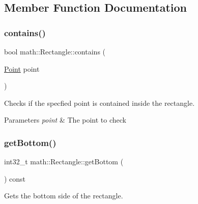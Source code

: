 \subsection{Member Function Documentation}
\mbox{\label{structmath_1_1_rectangle_af00591d871ba4b4eabb3725d8e7e3c03}} 
\subsubsection{\texorpdfstring{contains()}{contains()}}
{\footnotesize\ttfamily bool math\+::\+Rectangle\+::contains (\begin{DoxyParamCaption}\item[{\mbox{\hyperlink{struct_point}{Point}}}]{point }\end{DoxyParamCaption})\hspace{0.3cm}{\ttfamily [inline]}}



Checks if the specfied point is contained inside the rectangle. 


\begin{DoxyParams}{Parameters}
{\em point} & The point to check\\
\hline
\end{DoxyParams}
\mbox{\label{structmath_1_1_rectangle_ac9b27874d1c617d6fd6a573ece887847}} 
\subsubsection{\texorpdfstring{getBottom()}{getBottom()}}
{\footnotesize\ttfamily int32\+\_\+t math\+::\+Rectangle\+::get\+Bottom (\begin{DoxyParamCaption}{ }\end{DoxyParamCaption}) const\hspace{0.3cm}{\ttfamily [inline]}}



Gets the bottom side of the rectangle. 

\mbox{\label{structmath_1_1_rectangle_aa72d1b0179df2d39648e0ed78180706a}} 
